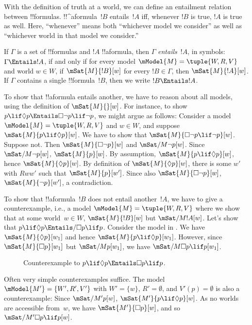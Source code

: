 \documentclass[../../../include/open-logic-section]{subfiles}
\begin{document}

\begin{explain}
  With the definition of truth at a world, we can define an entailment
  relation between !!{formula}s. !!^a{formula}~$!B$ entails~$!A$ iff,
  whenever $!B$ is true, $!A$ is true as well. Here, ``whenever''
  means both ``whichever model we consider'' as well as ``whichever
  world in that model we consider.''
\end{explain}

\begin{defn}
  If $\Gamma$ is a set of !!{formula}s and $!A$ !!a{formula}, then
  $\Gamma$ \emph{entails}~$!A$, in symbols: $\Gamma \Entails !A$, if
  and only if for every model $\mModel{M} = \tuple{W, R, V}$ and world
  $w \in W$, if $\mSat{M}{!B}[w]$ for every $!B \in \Gamma$, then
  $\mSat{M}{!A}[w]$. If $\Gamma$ contains a single !!{formula}~$!B$,
  then we write $!B \Entails !A$.
\end{defn}

\begin{ex}
  To show that !!a{formula} entails another, we have to reason about
  all models, using the definition of $\mSat{M}{}[w]$. For instance,
  to show $p \lif \Diamond p \Entails \Box\lnot p \lif \lnot p$, we
  might argue as follows: Consider a model $\mModel{M} = \tuple{W, R,
    V}$ and $w \in W$, and suppose $\mSat{M}{p \lif \Diamond
    p}[w]$. We have to show that $\mSat{M}{\Box\lnot p \lif \lnot
    p}[w]$. Suppose not. Then $\mSat{M}{\Box\lnot p}[w]$ and
  $\mSat/{M}{\lnot p}[w]$. Since $\mSat/{M}{\lnot p}[w]$, $\mSat{M}{
    p}[w]$. By assumption, $\mSat{M}{p \lif \Diamond p}[w]$, hence
  $\mSat{M}{\Diamond p}[w]$. By definition of $\mSat{M}{\Diamond
    p}[w]$, there is some $w'$ with $Rww'$ such that
  $\mSat{M}{p}[w']$. Since also $\mSat{M}{\Box \lnot p}[w]$,
  $\mSat{M}{\lnot p}[w']$, a contradiction.

  To show that !!a{formula}~$!B$ does not entail another~$!A$, we have
  to give a counterexample, i.e., a model $\mModel{M} = \tuple{W, R,
    V}$ where we show that at some world~$w \in W$, $\mSat{M}{!B}[w]$
  but $\mSat/{M}{!A}[w]$. Let's show that $p \lif \Diamond p \Entails/
  \Box p \lif p$. Consider the model in .  We
  have $\mSat{M}{\Diamond p}[w_1]$ and hence $\mSat{M}{p \lif
    \Diamond p}[w_1]$. However, since $\mSat{M}{\Box p}[w_1]$ but
  $\mSat/{M}{p}[w_1]$, we have $\mSat/{M}{\Box p \lif p}[w_1]$.
  \begin{figure}
  \centering
  \caption{Counterexample to $p \lif \Diamond p
  \Entails \Box p \lif p$.}
  \end{figure}
  
  Often very simple counterexamples suffice. The model $\mModel{M'} =
  \{W', R', V'\}$ with $W' = \{w\}$, $R' = \emptyset$, and $V'(p) =
  \emptyset$ is also a counterexample: Since $\mSat/{M'}{p}[w]$,
  $\mSat{M'}{p \lif \Diamond p}[w]$. As no worlds are accessible
  from~$w$, we have $\mSat{M'}{\Box p}[w]$, and so $\mSat/{M'}{\Box p
    \lif p}[w]$.
\end{ex}
\end{document}
